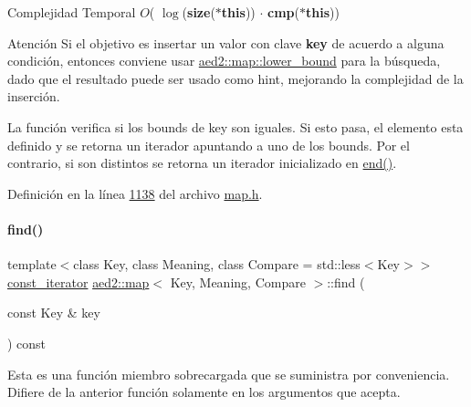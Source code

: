 \begin{DoxyDescription}
\item[Complejidad Temporal]$O$( $\log$({\bfseries size}({\bfseries $\ast$this})) $\cdot$ {\bfseries cmp}({\bfseries $\ast$this}))
\end{DoxyDescription}

\begin{DoxyAttention}{Atención}
Si el objetivo es insertar un valor con clave {\bfseries key} de acuerdo a alguna condición, entonces conviene usar \hyperlink{classaed2_1_1map_a62075a47afdf89267c5462f88164af3d_a62075a47afdf89267c5462f88164af3d}{aed2\+::map\+::lower\+\_\+bound} para la búsqueda, dado que el resultado puede ser usado como hint, mejorando la complejidad de la inserción.
\end{DoxyAttention}
La función verifica si los bounds de key son iguales. Si esto pasa, el elemento esta definido y se retorna un iterador apuntando a uno de los bounds. Por el contrario, si son distintos se retorna un iterador inicializado en \hyperlink{classaed2_1_1map_a76023e6a56cb625513e1b5ea028bf983_a76023e6a56cb625513e1b5ea028bf983}{end()}. 

Definición en la línea \hyperlink{map_8h_source_l01138}{1138} del archivo \hyperlink{map_8h_source}{map.\+h}.

\mbox{\label{classaed2_1_1map_adbf6f4ce01a16ca506e3c75fc2843882_adbf6f4ce01a16ca506e3c75fc2843882}} 
\paragraph{\texorpdfstring{find()}{find()}\hspace{0.1cm}{\footnotesize\ttfamily [2/2]}}
{\footnotesize\ttfamily template$<$class Key, class Meaning, class Compare = std\+::less$<$\+Key$>$$>$ \\
\hyperlink{classaed2_1_1map_1_1const__iterator}{const\+\_\+iterator} \hyperlink{classaed2_1_1map}{aed2\+::map}$<$ Key, Meaning, Compare $>$\+::find (\begin{DoxyParamCaption}\item[{const Key \&}]{key }\end{DoxyParamCaption}) const\hspace{0.3cm}{\ttfamily [inline]}}

Esta es una función miembro sobrecargada que se suministra por conveniencia. Difiere de la anterior función solamente en los argumentos que acepta. 

